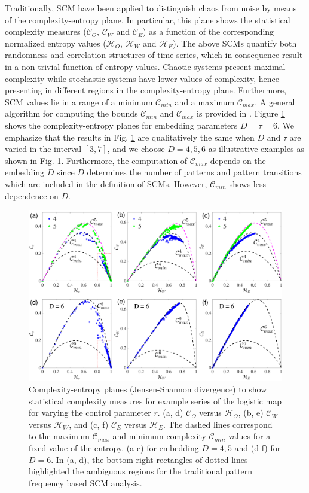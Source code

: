 \documentclass[12pt,aip,cha,reprint,nofootinbib]{revtex4-1}
\begin{document}
Traditionally, SCM have been applied to distinguish chaos from noise by means of the complexity-entropy plane. In particular, this plane shows the statistical complexity measures ($\mathcal{C}_O$, $\mathcal{C}_W$ and $\mathcal{C}_E$) as a function of the corresponding normalized entropy values ($\mathcal{H}_O$, $\mathcal{H}_W$ and $\mathcal{H}_E$). The above SCMs quantify both randomness and correlation structures of time series, which in consequence result in a non-trivial function of entropy  values. Chaotic systems present maximal complexity while stochastic systems have lower values of complexity, hence presenting in different regions in the complexity-entropy plane\cite{rossoPRL2007}. Furthermore, SCM values lie in a range of a minimum $\mathcal{C}_{min}$ and a maximum $\mathcal{C}_{max}$. A general algorithm for computing the bounds $\mathcal{C}_{min}$ and $\mathcal{C}_{max}$ is provided in \cite{martinPhyA2006}. Figure \ref{fig:fBmNoise} shows the complexity-entropy planes for embedding parameters $D = \tau = 6$. We emphasize that the results in Fig. \ref{fig:fBmNoise} are qualitatively the same when $D$ and $\tau$ are varied in the interval $[3, 7]$, and we choose $D = 4, 5, 6$ as illustrative examples as shown in Fig. \ref{fig:fBmNoise}. Furthermore, the computation of $\mathcal{C}_{max}$ depends on the embedding $D$ since $D$ determines the number of patterns and pattern transitions which are included in the definition of SCMs. However, $\mathcal{C}_{min}$ shows less dependence on $D$. 
\begin{figure}
	\centering 
	\includegraphics[width=2\columnwidth]{CompEntropy_LogisticHC.pdf}
\caption{\small{Complexity-entropy planes (Jensen-Shannon divergence) to show statistical complexity measures for example series of the logistic map for varying the control parameter $r$. (a, d) $\mathcal{C}_O$ versus $\mathcal{H}_O$, (b, e) $\mathcal{C}_{W}$ versus $\mathcal{H}_{W}$, and (c, f) $\mathcal{C}_{E}$ versus $\mathcal{H}_{E}$. The dashed lines correspond to the maximum $\mathcal{C}_{max}$ and minimum complexity $\mathcal{C}_{min}$ values for a fixed value of the entropy. (a-c) for embedding $D = 4, 5$ and (d-f) for $D = 6$. In (a, d), the bottom-right rectangles of dotted lines highlighted the ambiguous regions for the traditional pattern frequency based SCM analysis. }  \label{fig:fBmNoise}}
\end{figure}
\end{document}
